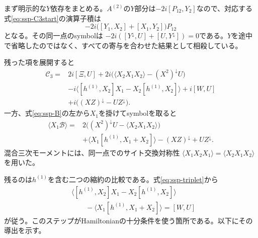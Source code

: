 まず明示的な$Y$依存をまとめる。$A^{(2)}$の$Y$部分は$-2i[P_{12},Y_2]$なので、対応する式\eqref{eq:ssp-C3start}の演算子積は
\begin{equation}
-2i\bigl([Y_1,X_2]+[X_1,Y_2]\bigr)P_{12}
\end{equation}
となる。その同一点のsymbolは
$-2i([Y^\downarrow,U]+[U,Y^\downarrow])=0$である。$Y$を途中で省略したのではなく、すべての寄与を合わせた結果として相殺している。

残った項を展開すると
\begin{align}
\mathcal C_3={}&2i[\Xi,U]
+2i\bigl(\langle X_2X_1X_2\rangle-(X^2)^\downarrow U\bigr)\nonumber\\
&-i\langle[h^{(1)},X_2]X_1-X_2[h^{(1)},X_2]\rangle
+i[W,U]\nonumber\\
&+i\bigl((XZ)^\downarrow-UZ^\downarrow\bigr).
\label{eq:ssp-C3expanded}
\end{align}
一方、式\eqref{eq:ssp-B}の左から$X_1$を掛けてsymbolを取ると
\begin{align}
\langle X_1\mathcal B\rangle={}&
2\bigl((X^2)^\downarrow U-\langle X_2X_1X_2\rangle\bigr)\nonumber\\
&+\langle X_1[h^{(1)},X_1+X_2]\rangle
-(XZ)^\downarrow+UZ^\downarrow.
\label{eq:ssp-Bcontract}
\end{align}
混合三次モーメントには、同一点でのサイト交換対称性
$\langle X_1X_2X_1\rangle=\langle X_2X_1X_2\rangle$を用いた。

残るのは$h^{(1)}$を含む二つの縮約の比較である。式\eqref{eq:ssp-triplet}から
\begin{align}
&\langle[h^{(1)},X_2]X_1-X_2[h^{(1)},X_2]\rangle\nonumber\\
&\qquad-\langle X_1[h^{(1)},X_1+X_2]\rangle=[W,U]
\label{eq:ssp-hidentity}
\end{align}
が従う。このステップがHamiltonianの十分条件を使う箇所である。以下にその導出を示す。

